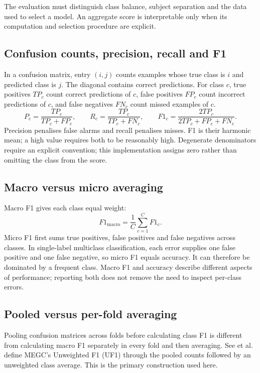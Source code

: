 The evaluation must distinguish class balance, subject separation and the data used to select a model. An aggregate score is interpretable only when its computation and selection procedure are explicit.

\subsection{Confusion counts, precision, recall and F1}
\label{sec:confusion-matrix}

In a confusion matrix, entry $(i,j)$ counts examples whose true class is $i$ and predicted class is $j$. The diagonal contains correct predictions. For class $c$, true positives $TP_c$ count correct predictions of $c$, false positives $FP_c$ count incorrect predictions of $c$, and false negatives $FN_c$ count missed examples of $c$.
\[
    P_c=\frac{TP_c}{TP_c+FP_c},\qquad
    R_c=\frac{TP_c}{TP_c+FN_c},\qquad
    F1_c=\frac{2TP_c}{2TP_c+FP_c+FN_c}.
\]
Precision penalises false alarms and recall penalises misses. F1 is their harmonic mean; a high value requires both to be reasonably high. Degenerate denominators require an explicit convention; this implementation assigns zero rather than omitting the class from the score.

\subsection{Macro versus micro averaging}
\label{sec:macro-micro}

Macro F1 gives each class equal weight:
\[
    F1_{\mathrm{macro}}=\frac1C\sum_{c=1}^{C}F1_c.
\]
Micro F1 first sums true positives, false positives and false negatives across classes. In single-label multiclass classification, each error supplies one false positive and one false negative, so micro F1 equals accuracy. It can therefore be dominated by a frequent class. Macro F1 and accuracy describe different aspects of performance; reporting both does not remove the need to inspect per-class errors.

\subsection{Pooled versus per-fold averaging}
\label{sec:pooled-vs-fold}

Pooling confusion matrices across folds before calculating class F1 is different from calculating macro F1 separately in every fold and then averaging. See et al.~\cite{see2019} define MEGC's Unweighted F1 (UF1) through the pooled counts followed by an unweighted class average. This is the primary construction used here.

